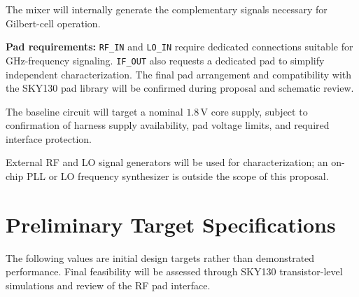 \documentclass[11pt,letterpaper]{article}
\begin{document}
The mixer will internally generate the complementary
signals necessary for Gilbert-cell operation.

\textbf{Pad requirements:}
\texttt{RF\_IN} and \texttt{LO\_IN} require dedicated
connections suitable for GHz-frequency signaling.
\texttt{IF\_OUT} also requests a dedicated pad to simplify
independent characterization. The final pad arrangement
and compatibility with the SKY130 pad library will be
confirmed during proposal and schematic review.

The baseline circuit will target a nominal
\(1.8\,\mathrm{V}\) core supply, subject to confirmation
of harness supply availability, pad voltage limits,
and required interface protection.

External RF and LO signal generators will be used for
characterization; an on-chip PLL or LO frequency
synthesizer is outside the scope of this proposal.


\section{Preliminary Target Specifications}

The following values are initial design targets rather
than demonstrated performance. Final feasibility will be
assessed through SKY130 transistor-level simulations and
review of the RF pad interface.
\end{document}
